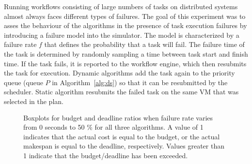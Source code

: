 \documentclass[conference]{IEEEtran}
\begin{document}
Running workflows consisting of large numbers of tasks on distributed systems
almost always faces different types of failures. The goal of this experiment was
to asses the behaviour of the algorithms in the presence of task execution
failures by introducing a failure model into the simulator. The model is
characterized by a failure rate $f$ that defines the probability that a task
will fail. The failure time of the task is determined by randomly sampling a
time between task start and finish time. If the task fails, it is reported to
the workflow engine, which then resubmits the task for execution. Dynamic algorithms
add the task again to the priority queue (queue $P$ in Algorithm~\ref{alg:ds})
so that it can be resubmitted by the scheduler. Static algorithm resubmits the
failed task on the same VM that was selected in the plan.

\begin{figure}[tb]
    \caption{Boxplots for budget and deadline ratios when failure rate varies
    from 0 seconds to 50 \% for all three algorithms. A value of 1
    indicates that the actual cost is equal to the budget, or the actual makespan is equal to the deadline, respectively. Values greater than 1 indicate that the budget/deadline has been exceeded.}
    \label{fig:failures}
\end{figure}
\end{document}
